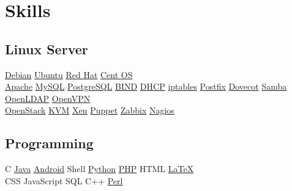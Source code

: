 \documentclass[]{deedy-resume-openfont}
\begin{document}
\begin{minipage}[t]{0.33\textwidth}

\section{Skills}
\subsection{Linux Server}
\href{http://www.debian.org/}{Debian} \textbullet{}
\href{http://www.ubuntu.com/}{Ubuntu} \textbullet{}
\href{http://www.redhat.com/}{Red Hat} \textbullet{}
\href{http://www.centos.org/}{Cent OS} \\
\href{http://httpd.apache.org/}{Apache} \textbullet{}
\href{https://www.mysql.com/}{MySQL} \textbullet{}
\href{http://www.postgresql.org/}{PostgreSQL} \textbullet{}
\href{https://www.isc.org/downloads/bind/}{BIND} \textbullet{}
\href{https://www.isc.org/downloads/dhcp/}{DHCP} \textbullet{}
\href{http://www.netfilter.org/}{iptables} \textbullet{}
\href{http://www.postfix.org/}{Postfix} \textbullet{}
\href{http://www.dovecot.org/}{Dovecot} \textbullet{}
\href{https://www.samba.org/}{Samba} \textbullet{}
\href{http://www.openldap.org/}{OpenLDAP} \textbullet{}
\href{https://openvpn.net/}{OpenVPN} \\
\href{http://openstack.org/}{OpenStack} \textbullet{}
\href{http://www.linux-kvm.org/}{KVM} \textbullet{}
\href{http://xenproject.org/}{Xen} \textbullet{}
\href{http://puppetlabs.com/}{Puppet} \textbullet{}
\href{http://www.zabbix.com/}{Zabbix} \textbullet{}
\href{http://www.nagios.com/}{Nagios}
\sectionsep

\subsection{Programming}
C \textbullet{}
\href{https://www.oracle.com/java/}{Java} \textbullet{}
\href{http://android.com}{Android} \textbullet{}
Shell \textbullet{}
\href{http://www.python.org}{Python} \textbullet{}
\href{http://www.php.net}{PHP} \textbullet{}
HTML \textbullet{}
\href{http://www.latex-project.org}{\LaTeX}\\
CSS \textbullet{}
JavaScript \textbullet{}
SQL \textbullet{}
C++ \textbullet{}
\href{https://www.perl.org/}{Perl}
\sectionsep


\end{minipage}
\end{document}

